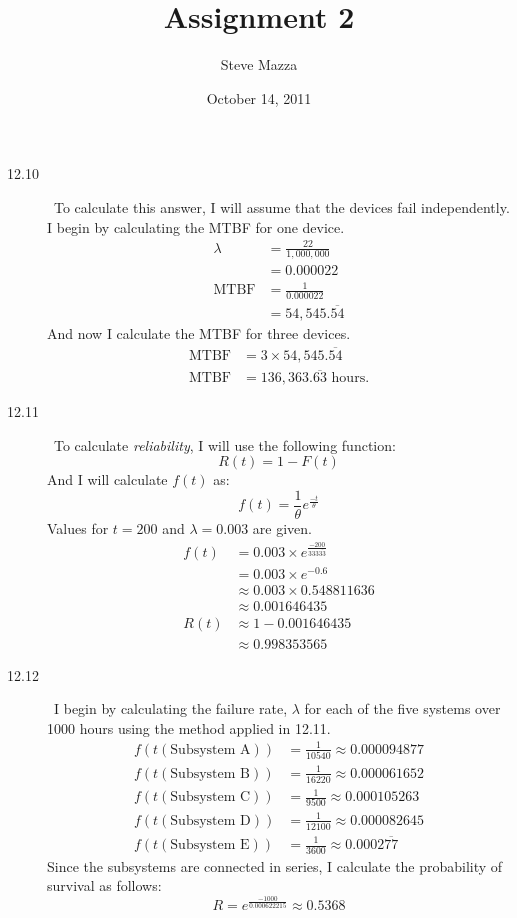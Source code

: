\documentclass[letterpaper,10pt]{article}
\title{Assignment 2}
\author{Steve Mazza}
\date{October 14, 2011}
\begin{document}
\maketitle

\begin{description}
\item[12.10]\ 
To calculate this answer, I will assume that the devices fail independently.  I begin by calculating the MTBF for one device.
\begin{align*}
\lambda &= \frac{22}{1,000,000} \\
&= 0.000022 \\
\mbox{MTBF} &= \frac{1}{0.000022} \\
&= 54,545.\overline{54}
\end{align*}
And now I calculate the MTBF for three devices.
\begin{align*}
\mbox{MTBF} &= 3\times 54,545.\overline{54} \\
\mbox{MTBF} &= 136,363.\overline{63} \mbox{\ hours.}
\end{align*}

\item[12.11]\ 
To calculate \emph{reliability}, I will use the following function: \[R(t) = 1-F(t)\] And I will calculate $f(t)$ as: \[f(t)=\frac{1}{\theta}e^{\frac{-t}{\theta}}\]  Values for $t=200$ and $\lambda=0.003$ are given.
\begin{align*}
f(t) &= 0.003\times e^{\frac{-200}{333\overline{33}}} \\
&= 0.003\times e^{-0.6} \\
&\approx 0.003\times 0.548811636 \\
&\approx 0.001646435 \\
R(t) &\approx 1-0.001646435 \\
&\approx 0.998353565
\end{align*}

\item[12.12]\ 
I begin by calculating the failure rate, $\lambda$ for each of the five systems over 1000 hours using the method applied in 12.11.
\begin{align*}
f(t(\mbox{Subsystem A})) &= \frac{1}{10540} \approx 0.000094877 \\
f(t(\mbox{Subsystem B})) &= \frac{1}{16220} \approx 0.000061652 \\
f(t(\mbox{Subsystem C})) &= \frac{1}{9500} \approx 0.000105263 \\
f(t(\mbox{Subsystem D})) &= \frac{1}{12100} \approx 0.000082645 \\
f(t(\mbox{Subsystem E})) &= \frac{1}{3600} \approx 0.0002\overline{77} 
\end{align*}
Since the subsystems are connected in series, I calculate the probability of survival as follows:
\[
R = e^{\frac{-1000}{0.000622215}} \approx 0.5368
\]


\end{description}
\end{document}
